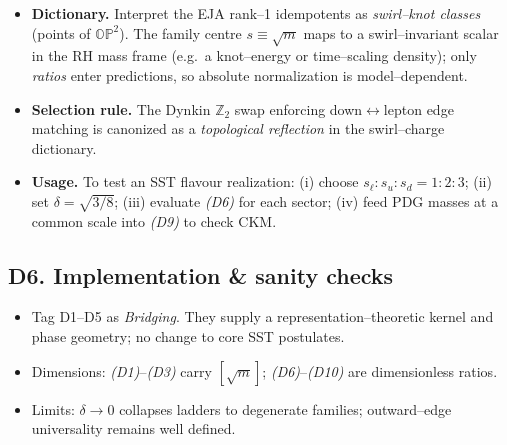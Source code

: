 \documentclass[11pt]{article}
\begin{document}
          \begin{itemize}
          \item \textbf{Dictionary.} Interpret the EJA rank–1 idempotents as \emph{swirl–knot classes} (points of $\mathbb{OP}^{2}$). The family centre $s\equiv\sqrt{m}$ maps to a swirl–invariant scalar in the RH mass frame (e.g.\ a knot–energy or time–scaling density); only \emph{ratios} enter predictions, so absolute normalization is model–dependent.
          \item \textbf{Selection rule.} The Dynkin $\mathbb{Z}_{2}$ swap enforcing down$\leftrightarrow$lepton edge matching is canonized as a \emph{topological reflection} in the swirl–charge dictionary.
          \item \textbf{Usage.} To test an SST flavour realization: (i) choose $s_{\ell}\!:\!s_{u}\!:\!s_{d}=1\!:\!2\!:\!3$; (ii) set $\delta=\sqrt{3/8}$; (iii) evaluate \emph{(D6)} for each sector; (iv) feed PDG masses at a common scale into \emph{(D9)} to check CKM.
          \end{itemize}

      \subsection*{D6. Implementation \& sanity checks}

          \begin{itemize}
          \item Tag D1–D5 as \emph{Bridging}. They supply a representation–theoretic kernel and phase geometry; no change to core SST postulates.
          \item Dimensions: \emph{(D1)}–\emph{(D3)} carry $[\sqrt{m}]$; \emph{(D6)}–\emph{(D10)} are dimensionless ratios.
          \item Limits: $\delta\to 0$ collapses ladders to degenerate families; outward–edge universality remains well defined.
          \end{itemize}
\end{document}
